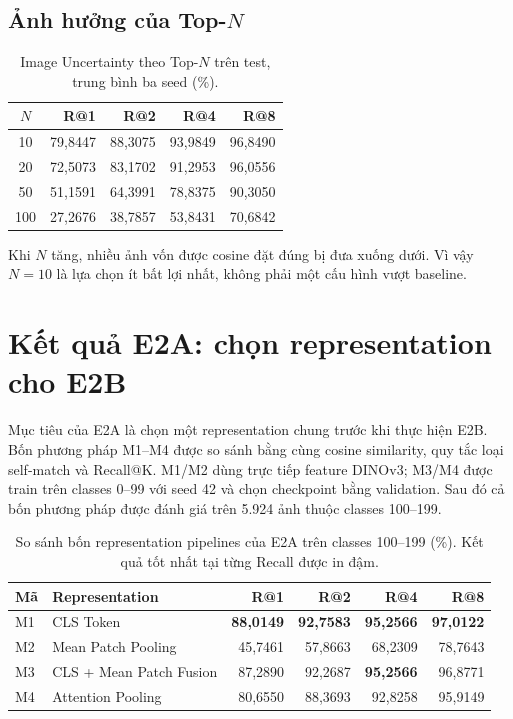 \documentclass[11pt,a4paper]{article}
\begin{document}
\subsection{Ảnh hưởng của Top-$N$}
\begin{table}[H]
\centering
\caption{Image Uncertainty theo Top-$N$ trên test, trung bình ba seed (\%).}
\begin{tabular}{@{}crrrr@{}}
\toprule
$N$ & R@1 & R@2 & R@4 & R@8\\ \midrule
10  & 79,8447 & 88,3075 & 93,9849 & 96,8490\\
20  & 72,5073 & 83,1702 & 91,2953 & 96,0556\\
50  & 51,1591 & 64,3991 & 78,8375 & 90,3050\\
100 & 27,2676 & 38,7857 & 53,8431 & 70,6842\\
\bottomrule
\end{tabular}
\end{table}

Khi $N$ tăng, nhiều ảnh vốn được cosine đặt đúng bị đưa xuống dưới. Vì vậy
$N=10$ là lựa chọn ít bất lợi nhất, không phải một cấu hình vượt baseline.

\section{Kết quả E2A: chọn representation cho E2B}
Mục tiêu của E2A là chọn một representation chung trước khi thực hiện E2B.
Bốn phương pháp M1--M4 được so sánh bằng cùng cosine similarity, quy tắc loại
self-match và Recall@K. M1/M2 dùng trực tiếp feature DINOv3; M3/M4 được train
trên classes 0--99 với seed 42 và chọn checkpoint bằng validation. Sau đó cả
bốn phương pháp được đánh giá trên 5.924 ảnh thuộc classes 100--199.

\begin{table}[H]
\centering
\caption{So sánh bốn representation pipelines của E2A trên classes 100--199
(\%). Kết quả tốt nhất tại từng Recall được in đậm.}
\label{tab:e2a-representations}
\begin{tabular}{@{}llrrrr@{}}
\toprule
Mã & Representation & R@1 & R@2 & R@4 & R@8\\ \midrule
M1 & CLS Token & \textbf{88,0149} & \textbf{92,7583}
& \textbf{95,2566} & \textbf{97,0122}\\
M2 & Mean Patch Pooling & 45,7461 & 57,8663 & 68,2309 & 78,7643\\
M3 & CLS + Mean Patch Fusion & 87,2890 & 92,2687 & \textbf{95,2566} & 96,8771\\
M4 & Attention Pooling & 80,6550 & 88,3693 & 92,8258 & 95,9149\\
\bottomrule
\end{tabular}
\end{table}
\end{document}
